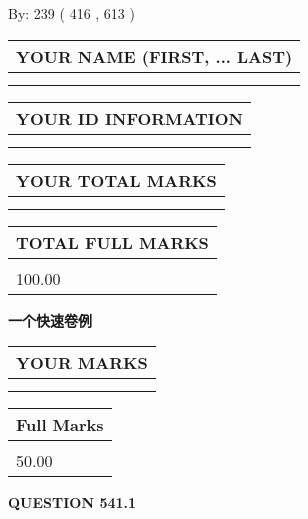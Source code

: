 \documentclass{ctexart}
\begin{document}
   
\hspace{1.0in} By: 
 239 ( 416 ,  613 )
   
   
   
   
\newpage 
\setcounter{page}{ 
   541001 } 
   
   
   
   
\noindent\begin{tabular}{|l|}
\hline
YOUR NAME (FIRST, ... LAST)  \\
\hline
 \\ 
 \\ 
\hline
\end{tabular}
\hspace{0.05in} \begin{tabular}{|l|}
\hline
 YOUR   ID   INFORMATION  \\
\hline
 \\ 
 \\ 
\hline
\end{tabular}
   
   
\vspace{0.2in}\noindent\begin{tabular}{|l|}
\hline
YOUR TOTAL MARKS  \\
\hline
 \\ 
 \\ 
\hline
\end{tabular}
\hspace{0.05in} \begin{tabular}{|l|}
\hline
TOTAL FULL MARKS  \\
\hline
 \\ 
100.00 \\
\hline
\end{tabular}
   
   
 \vspace{0.2in}
{\LARGE {\textbf{ 一个快速卷例}}}
   
   
  
\vspace{0.2in}
  
\noindent\begin{tabular}{|l|}
\hline
 YOUR MARKS  \\
\hline
 \\ 
 \\ 
\hline
\end{tabular}
\hspace{0.05in} \begin{tabular}{|l|}
\hline
 Full Marks  \\
\hline
 \\ 
50.00 \\
\hline
\end{tabular}
{\textbf{\Large{QUESTION
541.1 
}}}
  
\end{document}
